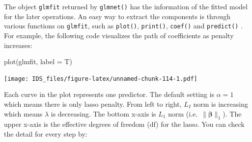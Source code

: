 \documentclass[
  12pt,
]{krantz}
\makeatletter
\newenvironment{Shaded}{\begin{snugshade}}{\end{snugshade}}
\newcommand{\AttributeTok}[1]{\textcolor[rgb]{0.61,0.61,0.61}{#1}}
\newcommand{\CommentTok}[1]{\textcolor[rgb]{0.37,0.37,0.37}{\textit{#1}}}
\newcommand{\DecValTok}[1]{\textcolor[rgb]{0.06,0.06,0.06}{#1}}
\newcommand{\FunctionTok}[1]{\textcolor[rgb]{0,0,0}{#1}}
\newcommand{\NormalTok}[1]{#1}
\newcommand{\OtherTok}[1]{\textcolor[rgb]{0.37,0.37,0.37}{#1}}
\newcommand{\SpecialCharTok}[1]{\textcolor[rgb]{0,0,0}{#1}}
\newcommand{\StringTok}[1]{\textcolor[rgb]{0.5,0.5,0.5}{#1}}
\newenvironment{kframe}{%
\medskip{}
\setlength{\fboxsep}{.8em}
 \def\at@end@of@kframe{}%
 \ifinner\ifhmode%
  \def\at@end@of@kframe{\end{minipage}}%
  \begin{minipage}{\columnwidth}%
 \fi\fi%
 \def\FrameCommand##1{\hskip\@totalleftmargin \hskip-\fboxsep
 \colorbox{shadecolor}{##1}\hskip-\fboxsep
     \hskip-\linewidth \hskip-\@totalleftmargin \hskip\columnwidth}%
 \MakeFramed {\advance\hsize-\width
   \@totalleftmargin\z@ \linewidth\hsize
   \@setminipage}}%
 {\par\unskip\endMakeFramed%
 \at@end@of@kframe}
\renewenvironment{Shaded}{\begin{kframe}}{\end{kframe}}
\makeatother
\begin{document}
\begin{Shaded}
\end{Shaded}

The object \texttt{glmfit} returned by \texttt{glmnet()} has the information of the fitted model for the later operations. An easy way to extract the components is through various functions on \texttt{glmfit}, such as \texttt{plot()}, \texttt{print()}, \texttt{coef()} and \texttt{predict()} . For example, the following code visualizes the path of coefficients as penalty increases:

\begin{Shaded}
\begin{Highlighting}[]
\FunctionTok{plot}\NormalTok{(glmfit, }\AttributeTok{label =}\NormalTok{ T)}
\end{Highlighting}
\end{Shaded}

\texttt{[image: IDS\_files/figure-latex/unnamed-chunk-114-1.pdf]}

Each curve in the plot represents one predictor. The default setting is \(\alpha=1\) which means there is only lasso penalty. From left to right, \(L_I\) norm is increasing which means \(\lambda\) is decreasing. The bottom x-axis is \(L_1\) norm (i.e.~\(\parallel\symbf{\beta}\parallel_{1}\)). The upper x-axis is the effective degrees of freedom (df) for the lasso. You can check the detail for every step by:
\end{document}
